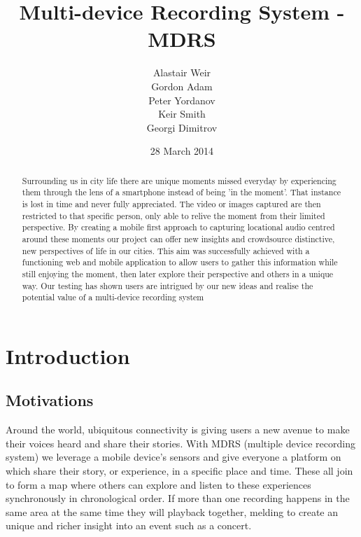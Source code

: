 \documentclass{l3proj}
\begin{document}
\setcounter{secnumdepth}{3}
\title{Multi-device Recording System - MDRS}
\author{Alastair Weir \\
        Gordon Adam \\
        Peter Yordanov \\
        Keir Smith \\
        Georgi Dimitrov}
\date{28 March 2014}
\maketitle
\begin{abstract}

Surrounding us in city life there are unique moments missed everyday by experiencing  them through the lens of a smartphone instead of being 'in the moment'. That instance is lost in time and never fully appreciated. The video or images captured are then restricted to that specific person, only able to relive the moment from their limited perspective. By creating a mobile first approach to capturing locational audio centred around these moments our project can offer new insights and crowdsource distinctive, new  perspectives of life in our cities. This aim was successfully achieved with a functioning web and mobile application to allow users to gather this information while still enjoying the moment, then later explore their perspective and others in a unique way. Our testing has shown users are intrigued by our new ideas and realise the potential value of a multi-device recording system

\end{abstract}
\educationalconsent
\tableofcontents
\chapter{Introduction}
\label{intro}

\section{Motivations}
Around the world, ubiquitous connectivity is giving users a new avenue to make their voices heard and share their stories. With MDRS (multiple device recording system) we leverage a mobile device’s sensors and give everyone a platform on which share their story, or experience, in a specific place and time. These all join to form a map where others can explore and listen to these experiences synchronously in chronological order. If more than one recording happens in the same area at the same time they will playback together, melding to create an unique and richer insight into an event such as a concert.
\end{document}
